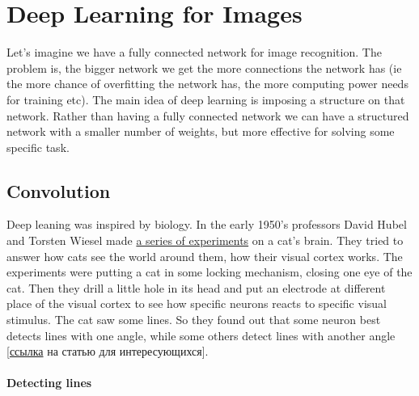 \chapter{Deep Learning for Images}

{\sf Let's imagine we have a fully connected network for image recognition. The problem is, the bigger network we get the more connections the network has (ie the more chance of overfitting the network has, the more computing power needs for training etc). The main idea of deep learning is imposing a structure on that network. Rather than having a fully connected network we can have a structured network with a smaller number of weights, but more effective for solving some specific task.}

\section{Convolution}

Deep leaning was inspired by biology. In the early 1950's professors David Hubel and Torsten Wiesel made \href{https://youtu.be/IOHayh06LJ4}{a series of experiments} on a cat's brain. They tried to answer how cats see the world around them, how their visual cortex works. The experiments were putting a cat in some locking mechanism, closing one eye of the cat. Then they drill a little hole in its head and put an electrode at different place of the visual cortex to see how specific neurons reacts to specific visual stimulus. The cat saw some lines. So they found out that some neuron best detects lines with one angle, while some others detect lines with another angle [\href{https://www.ncbi.nlm.nih.gov/pmc/articles/PMC1363130/pdf/jphysiol01298-0128.pdf}{ссылка} на статью для интересующихся].

\subsubsection*{Detecting lines}


